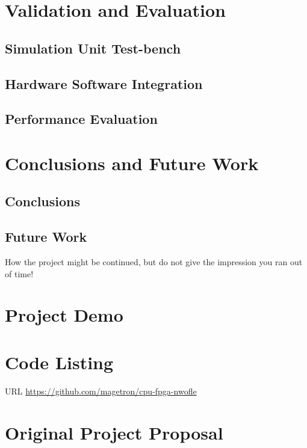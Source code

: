 \documentclass[a4paper]{report}
\begin{document}
\chapter{Validation and Evaluation}

\section{Simulation Unit Test-bench}

\section{Hardware Software Integration}

\section{Performance Evaluation}

\chapter{Conclusions and Future Work}

\section{Conclusions}

\section{Future Work}
How the project might be continued, but do not give the impression you ran out of time!

\printbibliography[title=References]

\appendix

\chapter{Project Demo}

\chapter{Code Listing}

URL \url{https://github.com/magetron/cpu-fpga-nwofle}

\chapter{Original Project Proposal}
\end{document}
